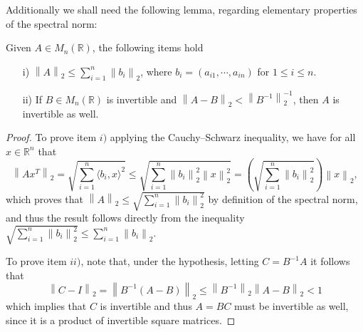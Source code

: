 \documentclass[lineno]{biometrika}
\newcommand{\R}{\mathbb{R}}
\newcommand{\bs}{\boldsymbol}
\begin{document}

Additionally we shall need the following lemma, regarding elementary properties of the spectral norm:
\begin{lemma}\label{matrices} Given $A\in M_n(\R)$, the following items hold
\begin{itemize}
\item[i)] $ \left\|A\right\|_2 \leq \sum_{i=1}^n \left\|b_i\right\|_2$,
where $b_i = (a_{i1},\cdots,a_{in})$ for $1\leq i\leq n$.
\item[ii)] If $B\in M_n(\R)$ is invertible and
$\left\|A-B\right\|_2<\left\|B^{-1}\right\|_2^{-1}$,
then $A$ is invertible as well.
\end{itemize}
\end{lemma}
\begin{proof}To prove item $i)$ applying the Cauchy–Schwarz inequality, we have for all $x\in \R^n$ that
\begin{equation*}
\left\|Ax^T\right\|_2 = \sqrt{\sum_{i=1}^n \langle b_i, x\rangle^2} \leq \sqrt{\sum_{i=1}^n \left\|b_i\right\|_2^2 \left\|x\right\|_2^2}=\left(\sqrt{\sum_{i=1}^n \left\|b_i\right\|_2^2}\right)\left\|x\right\|_2,
\end{equation*}
which proves that $\left\|A\right\|_2\leq \sqrt{\sum_{i=1}^n \left\|b_i\right\|_2^2}$ by definition of the spectral norm, and thus the result follows directly from the inequality $\sqrt{\sum_{i=1}^n \left\|b_i\right\|_2^2}\leq \sum_{i=1}^n \left\|b_i\right\|_2$.

To prove item $ii)$, note that, under the hypothesis, letting $C=B^{-1}A$ it follows that
\begin{equation*}
\left\|C-I\right\|_2 = \left\|B^{-1}(A-B)\right\|_2\leq \left\|B^{-1}\right\|_2\left\|A-B\right\|_2 < 1
\end{equation*}
which implies that $C$ is invertible and thus $A=BC$ must be invertible as well, since it is a product of invertible square matrices.
\end{proof}
\end{document}
